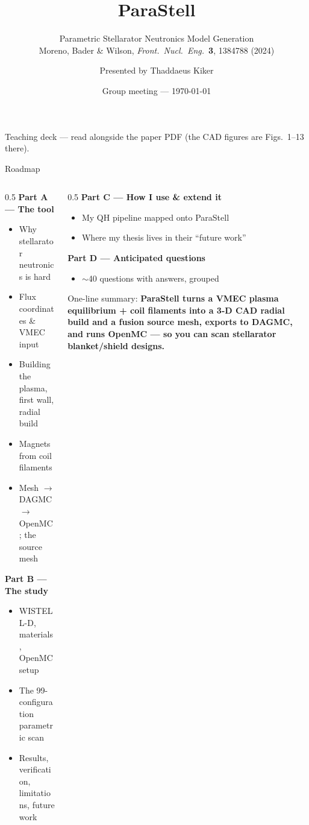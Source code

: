 \documentclass[aspectratio=169]{beamer}
\title{ParaStell}
\subtitle{Parametric Stellarator Neutronics Model Generation \\ \small Moreno, Bader \& Wilson, \emph{Front.\ Nucl.\ Eng.}\ \textbf{3}, 1384788 (2024)}
\author{Presented by Thaddaeus Kiker}
\date{Group meeting --- \today}
\newcommand{\kb}[1]{\begin{tcolorbox}[colback=key!5,colframe=key!60,boxsep=2pt,left=4pt,right=4pt,top=3pt,bottom=3pt]#1\end{tcolorbox}}
\begin{document}
\begin{frame}[plain]\titlepage
  \begin{center}\footnotesize\color{grey} Teaching deck --- read alongside the paper PDF (the CAD figures are Figs.~1--13 there).\end{center}
\end{frame}

\begin{frame}{Roadmap}
  \begin{columns}[t]
    \begin{column}{0.5\textwidth}
      \textbf{Part A --- The tool}
      \begin{itemize}\small
        \item Why stellarator neutronics is hard
        \item Flux coordinates \& VMEC input
        \item Building the plasma, first wall, radial build
        \item Magnets from coil filaments
        \item Mesh $\to$ DAGMC $\to$ OpenMC; the source mesh
      \end{itemize}
      \textbf{Part B --- The study}
      \begin{itemize}\small
        \item WISTELL-D, materials, OpenMC setup
        \item The 99-configuration parametric scan
        \item Results, verification, limitations, future work
      \end{itemize}
    \end{column}
    \begin{column}{0.5\textwidth}
      \textbf{Part C --- How I use \& extend it}
      \begin{itemize}\small
        \item My QH pipeline mapped onto ParaStell
        \item Where my thesis lives in their ``future work''
      \end{itemize}
      \textbf{Part D --- Anticipated questions}
      \begin{itemize}\small
        \item $\sim$40 questions with answers, grouped
      \end{itemize}
      \vspace{1em}
      \kb{\footnotesize One-line summary: \textbf{ParaStell turns a VMEC plasma equilibrium + coil filaments into a 3-D CAD radial build and a fusion source mesh, exports to DAGMC, and runs OpenMC --- so you can scan stellarator blanket/shield designs.}}
    \end{column}
  \end{columns}
\end{frame}
\end{document}
